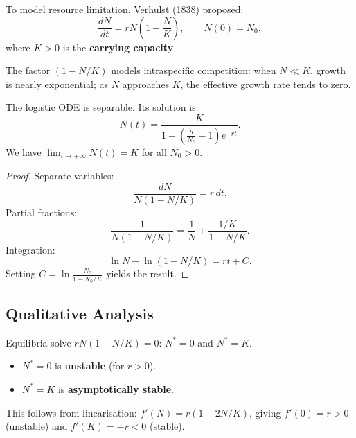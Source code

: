 \begin{definition}
To model resource limitation, Verhulst (1838) proposed:
\[
  \frac{dN}{dt} = rN\left(1 - \frac{N}{K}\right),
  \qquad N(0) = N_0,
\]
where $K > 0$ is the \textbf{carrying capacity}.
\end{definition}

\begin{intuition}[title=\textbf{Interpreting the logistic term}]
The factor $(1 - N/K)$ models intraspecific competition: when
$N \ll K$, growth is nearly exponential; as $N$ approaches $K$, the
effective growth rate tends to zero.
\end{intuition}

\begin{theorem}
The logistic ODE is separable.  Its solution is:
\[
  N(t) = \frac{K}{1 + \left(\frac{K}{N_0}-1\right)e^{-rt}}.
\]
We have $\lim_{t\to+\infty} N(t) = K$ for all $N_0 > 0$.
\end{theorem}

\begin{proof}
Separate variables:
\[
  \frac{dN}{N(1-N/K)} = r\,dt.
\]
Partial fractions:
\[
  \frac{1}{N(1-N/K)} = \frac{1}{N} + \frac{1/K}{1-N/K}.
\]
Integration:
\[
  \ln N - \ln(1-N/K) = rt + C.
\]
Setting $C = \ln\frac{N_0}{1-N_0/K}$ yields the result.
\end{proof}

\subsection{Qualitative Analysis}

Equilibria solve $rN(1-N/K)=0$: $N^*=0$ and $N^*=K$.

\begin{proposition}
\begin{itemize}
  \item $N^*=0$ is \textbf{unstable} (for $r>0$).
  \item $N^*=K$ is \textbf{asymptotically stable}.
\end{itemize}
This follows from linearisation: $f'(N)=r(1-2N/K)$, giving
$f'(0)=r>0$ (unstable) and $f'(K)=-r<0$ (stable).
\end{proposition}

